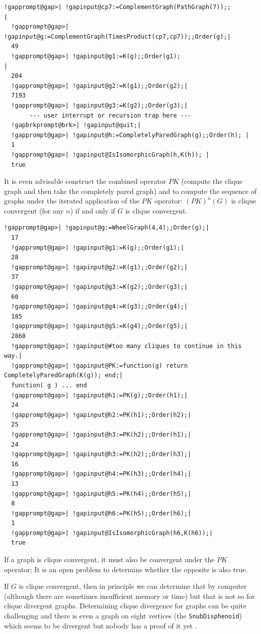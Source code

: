 \documentclass[a4paper,11pt]{report}
\begin{document}
{{ 
\begin{Verbatim}[commandchars=!@|,fontsize=\small,frame=single,label=Example]
  !gapprompt@gap>| !gapinput@cp7:=ComplementGraph(PathGraph(7));;       |
  !gapprompt@gap>| !gapinput@g:=ComplementGraph(TimesProduct(cp7,cp7));;Order(g);|
  49
  !gapprompt@gap>| !gapinput@g1:=K(g);;Order(g1);                                 |
  204
  !gapprompt@gap>| !gapinput@g2:=K(g1);;Order(g2);|
  7193
  !gapprompt@gap>| !gapinput@g3:=K(g2);;Order(g3);|
       --- user interrupt or recursion trap here ---
  !gapbrkprompt@brk>| !gapinput@quit;|
  !gapprompt@gap>| !gapinput@h:=CompletelyParedGraph(g);;Order(h); |
  1
  !gapprompt@gap>| !gapinput@IsIsomorphicGraph(h,K(h)); |
  true
\end{Verbatim}
 

It is even advisable construct the combined operator $PK$ (compute the clique graph and then take the completely pared graph) and to
compute the sequence of graphs under the iterated application of the $PK$ operator: $(PK)^n(G)$ is clique convergent (for any $n$) if and only if $G$ is clique convergent. 

 
\begin{Verbatim}[commandchars=!@|,fontsize=\small,frame=single,label=Example]
  !gapprompt@gap>| !gapinput@g:=WheelGraph(4,4);;Order(g);|
  17
  !gapprompt@gap>| !gapinput@g1:=K(g);;Order(g1);|
  28
  !gapprompt@gap>| !gapinput@g2:=K(g1);;Order(g2);|
  37
  !gapprompt@gap>| !gapinput@g3:=K(g2);;Order(g3);|
  60
  !gapprompt@gap>| !gapinput@g4:=K(g3);;Order(g4);|
  185
  !gapprompt@gap>| !gapinput@g5:=K(g4);;Order(g5);|
  2868
  !gapprompt@gap>| !gapinput@#too many cliques to continue in this way.|
  !gapprompt@gap>| !gapinput@PK:=function(g) return CompletelyParedGraph(K(g)); end;|
  function( g ) ... end
  !gapprompt@gap>| !gapinput@h1:=PK(g);;Order(h1);|
  24
  !gapprompt@gap>| !gapinput@h2:=PK(h1);;Order(h2);|
  25
  !gapprompt@gap>| !gapinput@h3:=PK(h2);;Order(h1);|
  24
  !gapprompt@gap>| !gapinput@h3:=PK(h2);;Order(h3);|
  16
  !gapprompt@gap>| !gapinput@h4:=PK(h3);;Order(h4);|
  13
  !gapprompt@gap>| !gapinput@h5:=PK(h4);;Order(h5);|
  8
  !gapprompt@gap>| !gapinput@h6:=PK(h5);;Order(h6);|
  1
  !gapprompt@gap>| !gapinput@IsIsomorphicGraph(h6,K(h6));|
  true
\end{Verbatim}
 

If a graph is clique convergent, it must also be convergent under the $PK$ operator; It is an open problem to determine whether the opposite is also
true. 

If $G$ is clique convergent, then in principle we can determine that by computer
(although there are sometimes insufficient memory or time) but that is not so
for clique divergent graphs. Determining clique divergence for graphs can be
quite challenging and there is even a graph on eight vertices (the \texttt{SnubDisphenoid}) which seems to be divergent but nobody has a proof of it yet \cite{LNP06}. 

}}
\end{document}
